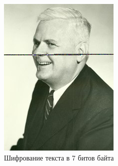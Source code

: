 \documentclass[10pt,a4paper,final]{article} %
\begin{document}
\begin{figure}[h!]
\begin{minipage}{0.3\textwidth}
		\includegraphics[width=\linewidth]{img/Haskell_7 (1)}
		\caption{Шифрование текста в 7 битов байта}
	\end{minipage}
	\hspace{0.02\textwidth}
	\begin{minipage}{0.3\textwidth}
		\centering

\end{minipage}
\end{figure}
\end{document}
